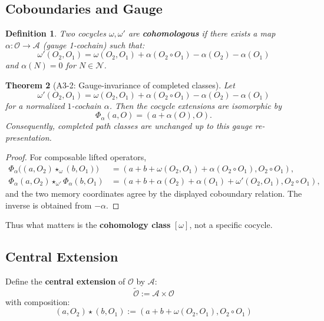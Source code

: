 \documentclass[12pt, oneside]{article}
\newtheorem{theorem}{Theorem}[section]
\newtheorem{definition}[theorem]{Definition}
\newcommand{\N}{\mathcal{N}}
\newcommand{\A}{\mathcal{A}}
\newcommand{\Opr}{\mathcal{O}}
\newcommand{\wtilde}{\widetilde}
\begin{document}
\subsection{Coboundaries and Gauge}

\begin{definition}
Two cocycles $\omega, \omega'$ are \textbf{cohomologous} if there exists a map $\alpha: \Opr \rightarrow \A$ (gauge 1-cochain) such that:
\begin{equation}
\omega'(O_2, O_1) = \omega(O_2, O_1) + \alpha(O_2 \circ O_1) - \alpha(O_2) - \alpha(O_1)
\end{equation}
and $\alpha(N) = 0$ for $N \in \N$.
\end{definition}

\begin{theorem}[A3-2: Gauge-invariance of completed classes]
Let
\[
\omega'(O_2,O_1)=\omega(O_2,O_1)+\alpha(O_2\circ O_1)-\alpha(O_2)-\alpha(O_1)
\]
for a normalized $1$-cochain $\alpha$. Then the cocycle extensions are isomorphic by
\[
\Phi_\alpha(a,O)=(a+\alpha(O),O).
\]
Consequently, completed path classes are unchanged up to this gauge re-presentation.
\end{theorem}

\begin{proof}
For composable lifted operators,
\[
\begin{aligned}
\Phi_\alpha\bigl((a,O_2)\star_\omega(b,O_1)\bigr)
&=(a+b+\omega(O_2,O_1)+\alpha(O_2\circ O_1),O_2\circ O_1),\\
\Phi_\alpha(a,O_2)\star_{\omega'}\Phi_\alpha(b,O_1)
&=(a+b+\alpha(O_2)+\alpha(O_1)+\omega'(O_2,O_1),O_2\circ O_1),
\end{aligned}
\]
and the two memory coordinates agree by the displayed coboundary relation. The inverse is obtained from $-\alpha$.
\end{proof}

Thus what matters is the \textbf{cohomology class} $[\omega]$, not a specific cocycle.

\subsection{Central Extension}

Define the \textbf{central extension} of $\Opr$ by $\A$:
\begin{equation}
\wtilde{\Opr} := \A \times \Opr
\end{equation}
with composition:
\begin{equation}
(a, O_2) \star (b, O_1) := (a + b + \omega(O_2, O_1), O_2 \circ O_1)
\end{equation}
\end{document}

